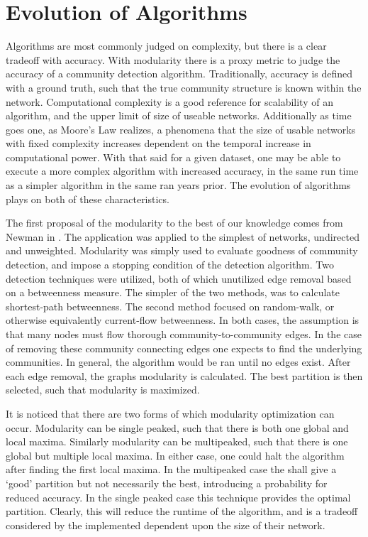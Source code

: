 \documentclass[a4paper, 12pt, twocolumn]{article}
\begin{document}
\section{Evolution of Algorithms}

Algorithms are most commonly judged on complexity, but there is a clear tradeoff with accuracy. 
With modularity there is a proxy metric to judge the accuracy of a community detection algorithm. 
Traditionally, accuracy is defined with a ground truth, such that the true community structure is known within the network. 
Computational complexity is a good reference for scalability of an algorithm, and the upper limit of size of useable networks. 
Additionally as time goes one, as Moore's Law realizes, a phenomena that the size of usable networks with fixed complexity increases dependent on the temporal increase in computational power. 
With that said for a given dataset, one may be able to execute a more complex algorithm with increased accuracy, in the same run time as a simpler algorithm in the same ran years prior. 
The evolution of algorithms plays on both of these characteristics. 

The first proposal of the modularity to the best of our knowledge comes from Newman in \cite{finding_and_evaling_comm_struct}. 
The application was applied to the simplest of networks, undirected and unweighted. 
Modularity was simply used to evaluate goodness of community detection, and impose a stopping condition of the detection algorithm. 
Two detection techniques were utilized, both of which unutilized edge removal based on a betweenness measure. 
The simpler of the two methods, was to calculate shortest-path betweenness. 
The second method focused on random-walk, or otherwise equivalently current-flow betweenness. 
In both cases, the assumption is that many nodes must flow thorough community-to-community edges. 
In the case of removing these community connecting edges one expects to find the underlying communities. 
In general, the algorithm would be ran until no edges exist. 
After each edge removal, the graphs modularity is calculated. 
The best partition is then selected, such that modularity is maximized.

It is noticed that there are two forms of which modularity optimization can occur. 
Modularity can be single peaked, such that there is both one global and local maxima. 
Similarly modularity can be multipeaked, such that there is one global but multiple local maxima. 
In either case, one could halt the algorithm after finding the first local maxima. 
In the multipeaked case the shall give a `good' partition but not necessarily the best, introducing a probability for reduced accuracy. 
In the single peaked case this technique provides the optimal partition. 
Clearly, this will reduce the runtime of the algorithm, and is a tradeoff considered by the implemented dependent upon the size of their network. 
\end{document}
